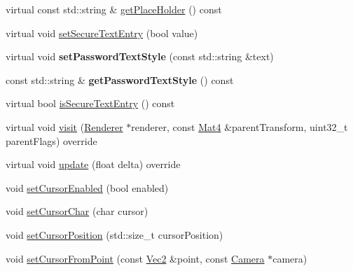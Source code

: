 \begin{DoxyCompactItemize}
virtual const std\+::string \& \hyperlink{classTextFieldTTF_a0cf968465bc0919d829bef4740bcfc64}{get\+Place\+Holder} () const
\item 
virtual void \hyperlink{classTextFieldTTF_aa2519e02bd0178cc680252dd9cca3b79}{set\+Secure\+Text\+Entry} (bool value)
\item 
\mbox{\label{classTextFieldTTF_a1ab5cebb0a2bb352d1ec1e65a0348551}} 
virtual void {\bfseries set\+Password\+Text\+Style} (const std\+::string \&text)
\item 
\mbox{\label{classTextFieldTTF_a76e384427fb50116b1d3e45003220eb0}} 
const std\+::string \& {\bfseries get\+Password\+Text\+Style} () const
\item 
virtual bool \hyperlink{classTextFieldTTF_ac838afc68a8ecf7a1d8a7f2b25013a2d}{is\+Secure\+Text\+Entry} () const
\item 
virtual void \hyperlink{classTextFieldTTF_af7cb31f513a3699cac12a42aebcd8bec}{visit} (\hyperlink{classRenderer}{Renderer} $\ast$renderer, const \hyperlink{classMat4}{Mat4} \&parent\+Transform, uint32\+\_\+t parent\+Flags) override
\item 
virtual void \hyperlink{classTextFieldTTF_a004230b3dc3f90069b3094152e7c8eb0}{update} (float delta) override
\item 
void \hyperlink{classTextFieldTTF_a831cdc10f96497cf3909457cc4e2380d}{set\+Cursor\+Enabled} (bool enabled)
\item 
void \hyperlink{classTextFieldTTF_ac638fa956caa6e3a3538b323b71cc23f}{set\+Cursor\+Char} (char cursor)
\item 
void \hyperlink{classTextFieldTTF_abedb3eab1bd2ad1f2ab945ebdde8347b}{set\+Cursor\+Position} (std\+::size\+\_\+t cursor\+Position)
\item 
void \hyperlink{classTextFieldTTF_adf65e756901cf94a0875e4b0c8e8a419}{set\+Cursor\+From\+Point} (const \hyperlink{classVec2}{Vec2} \&point, const \hyperlink{classCamera}{Camera} $\ast$camera)
\end{DoxyCompactItemize}
